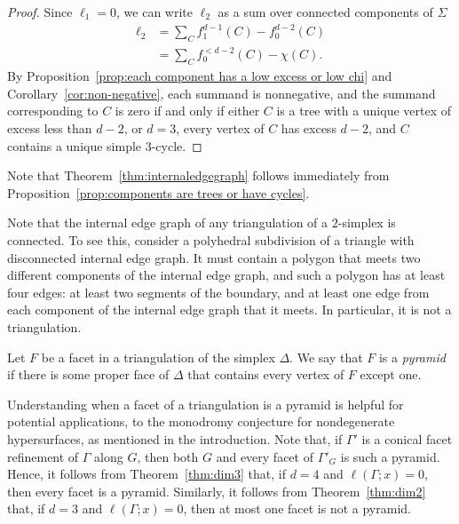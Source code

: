 \documentclass[ALCO,ThmDefs,Unicode,epreuves]{cedram}
\begin{document}
\begin{proof}
Since $\ell_1 = 0$, we can write $\ell_2$ as a sum over connected components of $\Sigma$
\begin{align*}
\ell_2 & = \sum_C f_1^{d-1}(C) - f_0^{d-2}(C)\\
& = \sum_C f_0^{< d-2}(C) - \chi(C).
\end{align*}
By Proposition~\ref{prop:each component has a low excess or low chi} and Corollary~\ref{cor:non-negative}, each summand is nonnegative, and the summand corresponding to $C$ is zero if and only if either $C$ is a tree with a unique vertex of excess less than $d-2$, or $d=3$, every vertex of $C$ has excess $d-2$, and $C$ contains a unique simple 3-cycle.
\end{proof}


Note that Theorem~\ref{thm:internaledgegraph} follows immediately from Proposition~\ref{prop:components are trees or have cycles}.

\begin{rema} \label{rem:connected}
Note that the internal edge graph of any triangulation of a $2$-simplex is connected. To see this, consider a polyhedral subdivision of a triangle with disconnected internal edge graph. It must contain a polygon that meets two different components of the internal edge graph, and such a polygon has at least four edges: at least two segments of the boundary, and at least one edge from each component of the internal edge graph that it meets. In particular, it is not a triangulation.
\end{rema}

\begin{defi}
Let $F$ be a facet in a triangulation of the simplex $\Delta$. 
We say that $F$ is a \emph{pyramid} if there is some proper face of $\Delta$ that 
contains every vertex of $F$ except one.
\end{defi}

\begin{rema} \label{rem:pyramids}
Understanding when a facet of a triangulation is a pyramid is helpful for potential 
applications, \eg to the monodromy conjecture for nondegenerate hypersurfaces, as 
mentioned in the introduction. Note that, if $\Gamma'$ is a conical facet refinement of 
$\Gamma$ along $G$, then both $G$ and every facet of $\Gamma'_G$ is such a pyramid. Hence, 
it follows from Theorem~\ref{thm:dim3} that, if $d = 4$ and $\ell(\Gamma;x) = 0$, then every facet is 
a pyramid. Similarly, it follows from Theorem~\ref{thm:dim2} that, if $d = 3$ and 
$\ell(\Gamma;x) = 0$, then at most one facet is not a pyramid. 
\end{rema}
\end{document}

